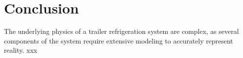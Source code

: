 \section{Conclusion} \label{sec:concl}








The underlying physics of a trailer refrigeration system are complex, as several components of the system require extensive modeling to accurately represent reality. xxx












